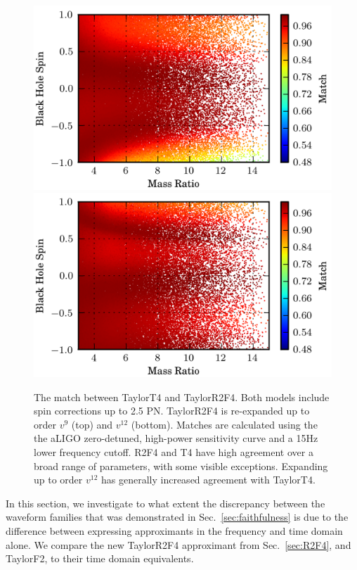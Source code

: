 \begin{figure}
\begin{minipage}[l]{\columnwidth}
\includegraphics[width=1.0	\textwidth]{papers/nsbh_faithfulness/figure8A.png}
\includegraphics[width=1.0	\textwidth]{papers/nsbh_faithfulness/figure8B.png}
\caption{\label{fig:f4t4fs}The match between TaylorT4 and TaylorR2F4. Both models include
spin corrections up to 2.5 \ac{PN}. TaylorR2F4 is  re-expanded up to order $v^9$ (top) 
and $v^{12}$ (bottom). Matches are calculated using the the aLIGO
zero-detuned, high-power sensitivity curve and a 15Hz lower frequency cutoff. R2F4 and T4 have
high agreement over a broad range of parameters, with some visible exceptions.
Expanding up to order $v^{12}$ has generally increased
agreement with TaylorT4. }
\end{minipage}
\end{figure}
In this section, we investigate to what extent the discrepancy between the waveform families that
was demonstrated in Sec.~\ref{sec:faithfulness} is due to the difference
between expressing approximants in the frequency and time domain alone.
We compare the new TaylorR2F4 approximant from
Sec.~\ref{sec:R2F4}, and TaylorF2, to their time domain equivalents.


